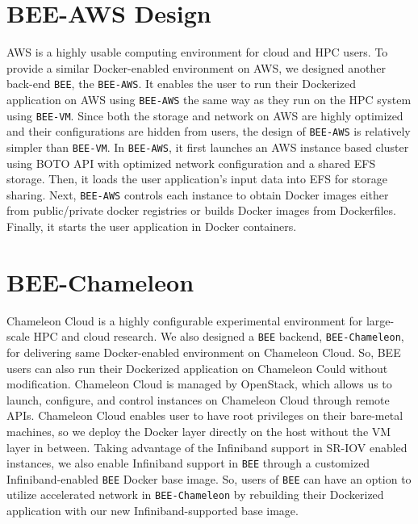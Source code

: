 \section{BEE-AWS Design}
AWS is a highly usable computing environment for cloud and HPC users. To provide a similar Docker-enabled environment on AWS, we designed another back-end \texttt{BEE}, the \texttt{BEE-AWS}. It enables the user to run their Dockerized application on AWS using \texttt{BEE-AWS} the same way as they run on the HPC system using \texttt{BEE-VM}. Since both the storage and network on AWS are highly optimized and their configurations are hidden from users, the design of \texttt{BEE-AWS} is relatively simpler than \texttt{BEE-VM}. In \texttt{BEE-AWS}, it first launches an AWS instance based cluster using BOTO API \cite{BOTOAPI} with optimized network configuration and a shared EFS storage. Then, it loads the user application's input data into EFS for storage sharing. Next, \texttt{BEE-AWS} controls each instance to obtain Docker images either from public/private docker registries or builds Docker images from Dockerfiles. Finally, it starts the user application in Docker containers.
\section{BEE-Chameleon}
Chameleon Cloud \cite{chameleon} is a highly configurable experimental environment for large-scale HPC and cloud research. We also designed a \texttt{BEE} backend, \texttt{BEE-Chameleon}, for delivering same Docker-enabled environment on Chameleon Cloud. So, BEE users can also run their Dockerized application on Chameleon Could without modification. Chameleon Cloud is managed by OpenStack, which allows us to launch, configure, and control instances on Chameleon Cloud through remote APIs. Chameleon Cloud enables user to have root privileges on their bare-metal machines, so we deploy the Docker layer directly on the host without the VM layer in between. Taking advantage of the Infiniband support in SR-IOV enabled instances, we also enable Infiniband support in \texttt{BEE} through a customized Infiniband-enabled \texttt{BEE} Docker base image. So, users of \texttt{BEE} can have an option to utilize accelerated network in \texttt{BEE-Chameleon} by rebuilding their Dockerized application with our new Infiniband-supported base image.